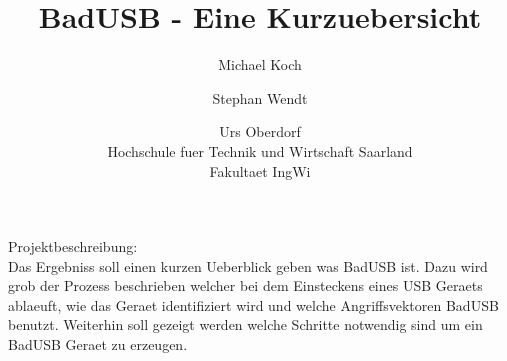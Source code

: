 \documentclass[ a4paper, 12pt, ]{article}
\title{BadUSB - Eine Kurzuebersicht}
\author{Michael Koch \and{Stephan Wendt} \and{Urs Oberdorf}\\Hochschule fuer Technik und Wirtschaft Saarland\\Fakultaet IngWi}
\date{} %
\begin{document}
\maketitle
Projektbeschreibung:\\
Das Ergebniss soll einen kurzen Ueberblick geben was BadUSB ist. Dazu wird grob der Prozess beschrieben
welcher bei dem Einsteckens eines USB Geraets ablaeuft, wie das Geraet identifiziert wird und welche 
Angriffsvektoren BadUSB benutzt. Weiterhin soll gezeigt werden welche Schritte notwendig sind um ein
BadUSB Geraet zu erzeugen.
\end{document}
